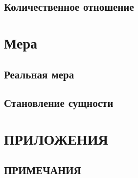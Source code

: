 \documentclass[a5paper, 11pt, twoside, onecolumn, openany]{memoir}
\begin{document}
\section{Количественное отношение}


\chapter{Мера}



\section{Реальная мера}


\section{Становление сущности}


\backmatter


\chapter*{ПРИЛОЖЕНИЯ}


\section[\mdseries Примечания]{ПРИМЕЧАНИЯ}


\clearpage
\tableofcontents*
\clearpage
\end{document}
